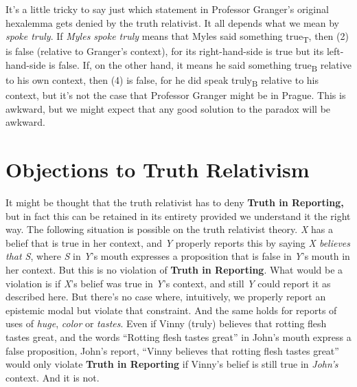 \documentclass[
  10pt,
  letterpaper,
  DIV=11,
  numbers=noendperiod,
  twoside]{scrartcl}
\begin{document}
It's a little tricky to say just which statement in Professor Granger's
original hexalemma gets denied by the truth relativist. It all depends
what we mean by \emph{spoke truly}. If \emph{Myles spoke truly} means
that Myles said something true\textsubscript{T}, then (2) is false
(relative to Granger's context), for its right-hand-side is true but its
left-hand-side is false. If, on the other hand, it means he said
something true\textsubscript{B} relative to his own context, then (4) is
false, for he did speak truly\textsubscript{B} relative to his context,
but it's not the case that Professor Granger might be in Prague. This is
awkward, but we might expect that any good solution to the paradox will
be awkward.

\section{Objections to Truth
Relativism}\label{objections-to-truth-relativism}

It might be thought that the truth relativist has to deny \textbf{Truth
in Reporting,} but in fact this can be retained in its entirety provided
we understand it the right way. The following situation is possible on
the truth relativist theory. \emph{X} has a belief that is true in her
context, and \emph{Y} properly reports this by saying \emph{X believes
that S}, where \emph{S} in \emph{Y}'s mouth expresses a proposition that
is false in \emph{Y}'s mouth in her context. But this is no violation of
\textbf{Truth in Reporting}. What would be a violation is if \emph{X}'s
belief was true in \emph{Y}'s context, and still \emph{Y} could report
it as described here. But there's no case where, intuitively, we
properly report an epistemic modal but violate that constraint. And the
same holds for reports of uses of \emph{huge}, \emph{color} or
\emph{tastes}. Even if Vinny (truly) believes that rotting flesh tastes
great, and the words ``Rotting flesh tastes great'' in John's mouth
express a false proposition, John's report, ``Vinny believes that
rotting flesh tastes great'' would only violate \textbf{Truth in
Reporting} if Vinny's belief is still true in \emph{John's} context. And
it is not.
\end{document}
